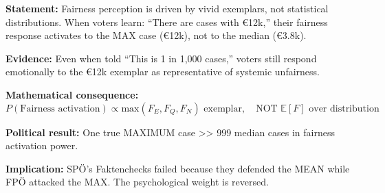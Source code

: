 \begin{tcolorbox}[colback=gray!5!white, colframe=gray!75!black,
    title=Axiom CM-7d: Fairness Activation by Exemplar, Not Distribution]

\textbf{Statement:} Fairness perception is driven by vivid exemplars, not statistical
distributions. When voters learn: ``There are cases with €12k,'' their fairness response
activates to the MAX case (€12k), not to the median (€3.8k).

\textbf{Evidence:} Even when told ``This is 1 in 1,000 cases,'' voters still respond emotionally
to the €12k exemplar as representative of systemic unfairness.

\textbf{Mathematical consequence:}
\begin{equation}
P(\text{Fairness activation}) \propto \text{max}(F_E, F_Q, F_N) \text{ exemplar},
\quad \text{NOT } \mathbb{E}[F] \text{ over distribution}
\end{equation}

\textbf{Political result:} One true MAXIMUM case >> 999 median cases in fairness activation power.

\textbf{Implication:} SPÖ's Faktenchecks failed because they defended the MEAN while
FPÖ attacked the MAX. The psychological weight is reversed.

\end{tcolorbox}

\vspace{0.5em}

